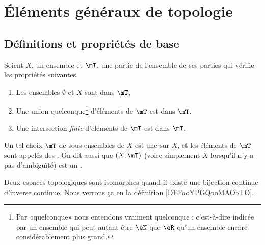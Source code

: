 

\section{Éléments généraux de topologie}


\subsection{Définitions et propriétés de base}

\begin{definition}		\label{DefTopologieGene}
	Soient \( X \), un ensemble et \( \mT \), une partie de l'ensemble de ses parties qui vérifie les propriétés suivantes.
	\begin{enumerate}
		\item
		      Les ensembles \( \emptyset \) et \( X \) sont dans \( \mT \),
		\item
		      Une union quelconque\footnote{Par «quelconque» nous entendons vraiment quelconque : c'est-à-dire indicée par un ensemble qui peut autant être \( \eN\) que \( \eR\) qu'un ensemble encore considérablement plus grand.} d'éléments de \( \mT\) est dans \( \mT\).
		\item		\label{ITEMooGJAPooOWIOzv}
		      Une intersection \emph{finie} d'éléments de \( \mT\) est dans \( \mT\).
	\end{enumerate}
	Un tel choix \( \mT \) de sous-ensembles de \( X \) est une   sur \( X \), et les éléments de \( \mT \) sont appelés des . On dit aussi que \( (X,\mT) \) (voire simplement \( X \) lorsqu'il n'y a pas d'ambiguïté) est un .
\end{definition}

Deux espaces topologiques sont isomorphes quand il existe une bijection continue d'inverse continue. Nous verrons ça en la définition \ref{DEFooYPGQooMAObTO}.


